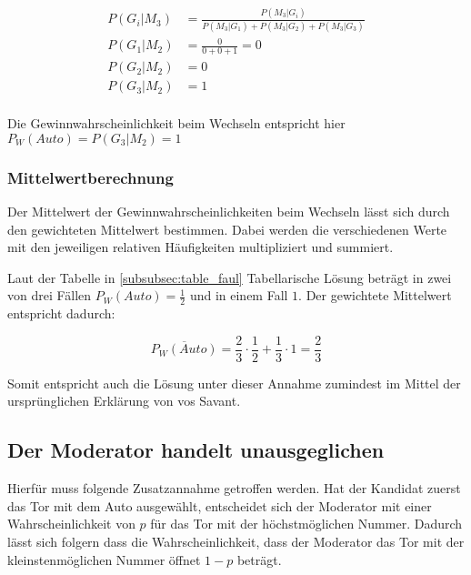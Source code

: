 \begin{align*}
    P(G_i | M_3) & = \frac{P(M_3 | G_i)}{P(M_3 | G_1) + P(M_3 | G_2) + P(M_3 | G_3)} \\
    P(G_1 | M_2) & = \frac{0}{0+0+1} = 0                                             \\
    P(G_2 | M_2) & = 0                                                               \\
    P(G_3 | M_2) & = 1                                                               \\
\end{align*}

Die Gewinnwahrscheinlichkeit beim Wechseln entspricht hier $P_W(Auto) = P(G_3 | M_2) = 1$

\subsubsection{Mittelwertberechnung}

Der Mittelwert der Gewinnwahrscheinlichkeiten beim Wechseln lässt sich durch den gewichteten Mittelwert bestimmen. Dabei werden die verschiedenen Werte mit den jeweiligen relativen Häufigkeiten multipliziert und summiert.

Laut der Tabelle in \ref{subsubsec:table_faul} Tabellarische Lösung beträgt in zwei von drei Fällen $P_W(Auto) = \frac{1}{2}$ und in einem Fall $1$. Der gewichtete Mittelwert entspricht dadurch:

\begin{equation}
    \label{equ:mittelwert_faul}
    \overline{P_W(Auto)} = \frac{2}{3} \cdot \frac{1}{2} + \frac{1}{3} \cdot 1 = \frac{2}{3}
\end{equation}

Somit entspricht auch die Lösung unter dieser Annahme zumindest im Mittel der ursprünglichen Erklärung von vos Savant.


\subsection{Der Moderator handelt unausgeglichen}

Hierfür muss folgende Zusatzannahme getroffen werden. Hat der Kandidat zuerst das Tor mit dem Auto ausgewählt, entscheidet sich der Moderator mit einer Wahrscheinlichkeit von $p$
für das Tor mit der höchstmöglichen Nummer. Dadurch lässt sich folgern dass die Wahrscheinlichkeit, dass der Moderator das Tor mit der kleinstenmöglichen Nummer öffnet $1 - p$ beträgt.

